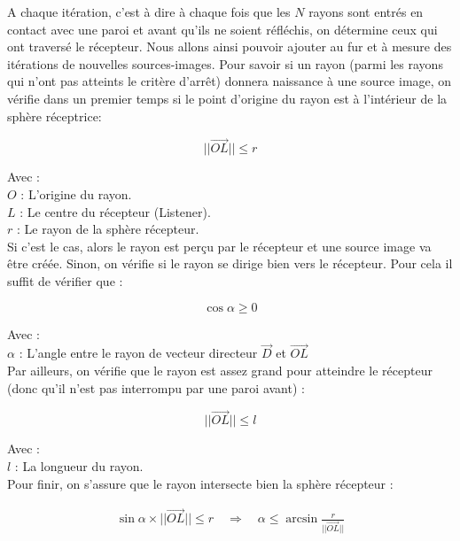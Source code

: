 A chaque itération, c'est à dire à chaque fois que les $N$ rayons sont entrés en contact avec une paroi et avant qu'ils ne soient réfléchis, on détermine ceux qui ont traversé le récepteur. Nous allons ainsi pouvoir ajouter au fur et à mesure des itérations de nouvelles sources-images. Pour savoir si un rayon (parmi les rayons qui n'ont pas atteints le critère d'arrêt) donnera naissance à une source image, on vérifie dans un premier temps si le point d'origine du rayon est à l'intérieur de la sphère réceptrice:

\begin{equation}
||\overrightarrow{OL}|| \leqslant r
\end{equation}

Avec : \\
$O$ : L'origine du rayon. \\
$L$ : Le centre du récepteur (Listener). \\
$r$ : Le rayon de la sphère récepteur. \\

Si c'est le cas, alors le rayon est perçu par le récepteur et une source image va être créée. Sinon, on vérifie si le rayon se dirige bien vers le récepteur. Pour cela il suffit de vérifier que :

\begin{equation}
\cos{\alpha} \geqslant 0
\end{equation}

Avec : \\
$\alpha$ : L'angle entre le rayon de vecteur directeur $\overrightarrow{D}$ et $\overrightarrow{OL}$  \\

Par ailleurs, on vérifie que le rayon est assez grand pour atteindre le récepteur (donc qu'il n'est pas interrompu par une paroi avant) :

\begin{equation}
||\overrightarrow{OL}|| \leqslant l
\end{equation}

Avec : \\
$l$ : La longueur du rayon. \\

Pour finir, on s'assure que le rayon intersecte bien la sphère récepteur :

\begin{align}
\sin{\alpha} \times ||\overrightarrow{OL}||  \leqslant r 
\quad \Rightarrow \quad
\alpha  \leqslant \arcsin{\frac{r}{||\overrightarrow{OL}||}}
\end{align}

